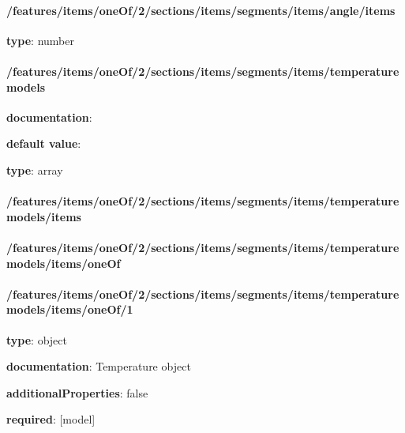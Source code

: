 \begin{itemized}
\paragraph{/features/items/oneOf/2/sections/items/segments/items/angle/items} \begin{itemized}
\item {\bf type}: number
\end{itemized}\end{itemized}\paragraph{/features/items/oneOf/2/sections/items/segments/items/temperature models} \begin{itemized}
\item {\bf documentation}: 
\item {\bf default value}: 
\item {\bf type}: array
\paragraph{/features/items/oneOf/2/sections/items/segments/items/temperature models/items} \begin{itemized}
\end{itemized}\end{itemized}\paragraph{/features/items/oneOf/2/sections/items/segments/items/temperature models/items/oneOf} \begin{itemized}
\end{itemized}\paragraph{/features/items/oneOf/2/sections/items/segments/items/temperature models/items/oneOf/1} \begin{itemized}
\item {\bf type}: object
\item {\bf documentation}: Temperature object
\item {\bf additionalProperties}: false
\item {\bf required}: [model]\end{itemized}
